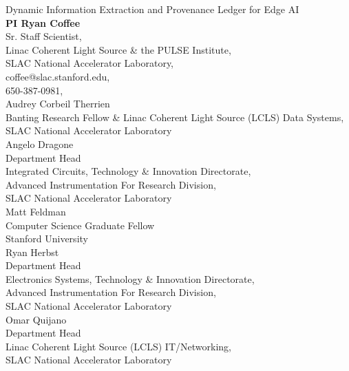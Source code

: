 \documentclass{article}
\begin{document}
\begin{centering}
\large
Dynamic Information Extraction and Provenance Ledger for Edge AI \\
\normalsize
	\vspace{\baselineskip}
	\textbf{PI Ryan Coffee}\\
	Sr. Staff Scientist,\\
	Linac Coherent Light Source \& the PULSE Institute,\\
	SLAC National Accelerator Laboratory, \\coffee@slac.stanford.edu,\\ 650-387-0981, \\
	\vspace{.5\baselineskip}
	Audrey Corbeil Therrien\\Banting Research Fellow \& Linac Coherent Light Source (LCLS) Data Systems,\\
	SLAC National Accelerator Laboratory\\
	\vspace{.5\baselineskip}
	Angelo Dragone\\
	Department Head\\
	Integrated Circuits, Technology \& Innovation Directorate,\\
	Advanced Instrumentation For Research Division,\\
	SLAC National Accelerator Laboratory\\
	\vspace{.5\baselineskip}
	Matt Feldman\\
	Computer Science Graduate Fellow\\
	Stanford University\\
	\vspace{.5\baselineskip}
	Ryan Herbst\\
	Department Head\\
	Electronics Systems, Technology \& Innovation Directorate,\\
	Advanced Instrumentation For Research Division,\\
	SLAC National Accelerator Laboratory\\
	\vspace{.5\baselineskip}
	Omar Quijano\\
	Department Head\\
	Linac Coherent Light Source (LCLS) IT/Networking,\\
	SLAC National Accelerator Laboratory\\
	\vspace{.5\baselineskip}

\end{centering}
\end{document}
